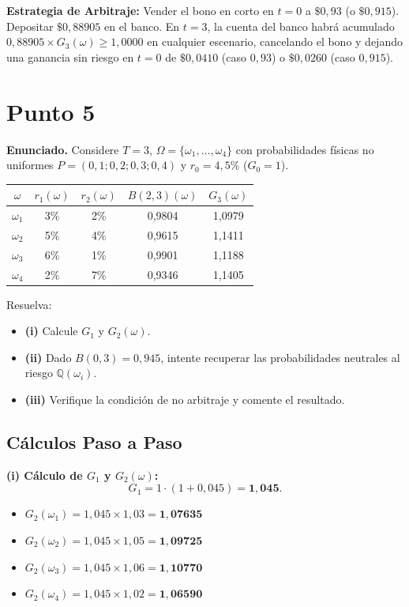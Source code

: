 \documentclass[11pt, a4paper]{article}
\begin{document}
\textbf{Estrategia de Arbitraje:} Vender el bono en corto en $t=0$ a $\$0{,}93$ (o $\$0{,}915$). Depositar $\$0{,}88905$ en el banco. En $t=3$, la cuenta del banco habrá acumulado $0{,}88905 \times G_3(\omega) \ge 1{,}0000$ en cualquier escenario, cancelando el bono y dejando una ganancia sin riesgo en $t=0$ de $\$0{,}0410$ (caso $0{,}93$) o $\$0{,}0260$ (caso $0{,}915$).

\newpage

\section*{Punto 5}
\textbf{Enunciado.} Considere $T=3$, $\Omega=\{\omega_1,\dots,\omega_4\}$ con probabilidades físicas no uniformes $P=(0{,}1; 0{,}2; 0{,}3; 0{,}4)$ y $r_0=4{,}5\%$ ($G_0=1$).

\begin{center}
\begin{tabular}{ccccc}
\toprule
$\omega$ & $r_1(\omega)$ & $r_2(\omega)$ & $B(2,3)(\omega)$ & $G_3(\omega)$ \\
\midrule
$\omega_1$ & 3\% & 2\% & 0{,}9804 & 1{,}0979 \\
$\omega_2$ & 5\% & 4\% & 0{,}9615 & 1{,}1411 \\
$\omega_3$ & 6\% & 1\% & 0{,}9901 & 1{,}1188 \\
$\omega_4$ & 2\% & 7\% & 0{,}9346 & 1{,}1405 \\
\bottomrule
\end{tabular}
\end{center}

Resuelva:
\begin{itemize}
    \item \textbf{(i)} Calcule $G_1$ y $G_2(\omega)$.
    \item \textbf{(ii)} Dado $B(0,3) = 0{,}945$, intente recuperar las probabilidades neutrales al riesgo $\mathbb{Q}(\omega_i)$.
    \item \textbf{(iii)} Verifique la condición de no arbitraje y comente el resultado.
\end{itemize}

\subsection*{Cálculos Paso a Paso}

\textbf{(i) Cálculo de $G_1$ y $G_2(\omega)$:}
\[
G_1 = 1 \cdot (1 + 0{,}045) = \mathbf{1{,}045}.
\]
\begin{itemize}
    \item $G_2(\omega_1) = 1{,}045 \times 1{,}03 = \mathbf{1{,}07635}$
    \item $G_2(\omega_2) = 1{,}045 \times 1{,}05 = \mathbf{1{,}09725}$
    \item $G_2(\omega_3) = 1{,}045 \times 1{,}06 = \mathbf{1{,}10770}$
    \item $G_2(\omega_4) = 1{,}045 \times 1{,}02 = \mathbf{1{,}06590}$
\end{itemize}
\end{document}
